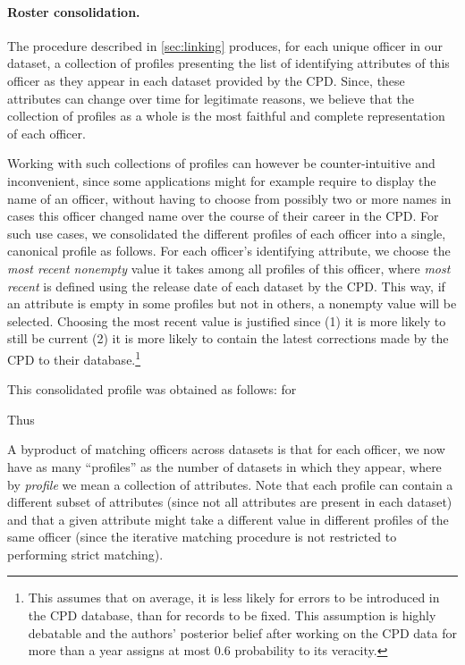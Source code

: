 \paragraph{Roster consolidation.}
The procedure described in \cref{sec:linking} produces, for each unique officer
in our dataset, a collection of profiles presenting the list of identifying
attributes of this officer as they appear in each dataset provided by the CPD.
Since, these attributes can change over time for legitimate reasons, we believe
that the collection of profiles as a whole is the most faithful and complete
representation of each officer.

Working with such collections of profiles can however be counter-intuitive and
inconvenient, since some applications might for example require to display the
name of an officer, without having to choose from possibly two or more names in
cases this officer changed name over the course of their career in the CPD. For
such use cases, we consolidated the different profiles of each officer into
a single, canonical profile as follows. For each officer's identifying
attribute, we choose the \emph{most recent nonempty} value it takes among all
profiles of this officer, where \emph{most recent} is defined using the release
date of each dataset by the CPD. This way, if an attribute is empty in some
profiles but not in others, a nonempty value will be selected. Choosing the
most recent value is justified since (1) it is more likely to still be current
(2) it is more likely to contain the latest corrections made by the CPD to
their database.\footnote{This assumes that on average, it is less likely for
errors to be introduced in the CPD database, than for records to be fixed. This
assumption is highly debatable and the authors' posterior belief after working
on the CPD data for more than a year assigns at most $0.6$ probability to its
veracity.}



This consolidated profile was obtained as follows:
for 



Thus 

A byproduct of matching officers across datasets is that for each officer, we
now have as many “profiles” as the number of datasets in which they appear,
where by \emph{profile} we mean a collection of attributes. Note that each
profile can contain a different subset of attributes (since not all attributes
are present in each dataset) and that a given attribute might take a different
value in different profiles of the same officer (since the iterative matching
procedure is not restricted to performing strict matching).

